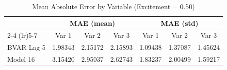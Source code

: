 \begin{table}[htbp]
\centering
\caption{Mean Absolute Error by Variable (Excitement = 0.50)}
\label{tab:mae_0p50}
\begin{tabular}{lcccccc}
\toprule
 & \multicolumn{3}{c}{MAE (mean)} & \multicolumn{3}{c}{MAE (std)} \\
\cmidrule(lr){2-4} \cmidrule(lr){5-7}
 & Var 1 & Var 2 & Var 3 & Var 1 & Var 2 & Var 3 \\
\midrule
BVAR Lag 5 & 1.98343 & 2.15172 & 2.15893 & 1.09438 & 1.37087 & 1.45624 \\
Model 16 & 3.15420 & 2.95037 & 2.62743 & 1.83237 & 2.00499 & 1.59217 \\
\bottomrule
\end{tabular}
\end{table}
